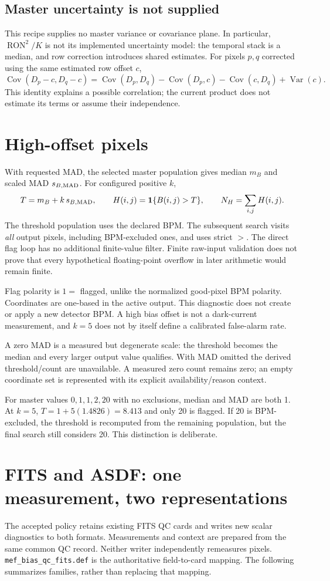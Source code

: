 \documentclass[11pt,a4paper]{article}
\newcommand{\code}[1]{\nolinkurl{#1}}
\newcommand{\Var}{\operatorname{Var}}\newcommand{\Cov}{\operatorname{Cov}}
\newcommand{\ind}{\mathbf{1}}
\begin{document}
\subsection*{Master uncertainty is not supplied}
This recipe supplies no master variance or covariance plane. In particular,
$\operatorname{RON}^2/K$ is not its implemented uncertainty model: the temporal
stack is a median, and row correction introduces shared estimates. For pixels
$p,q$ corrected using the same estimated row offset $c$,
\[
 \Cov(D_p-c,D_q-c)=\Cov(D_p,D_q)-\Cov(D_p,c)
 -\Cov(c,D_q)+\Var(c).
\]
This identity explains a possible correlation; the current product does not
estimate its terms or assume their independence.

\newpage
\section{High-offset pixels}
With requested MAD, the selected master population gives median $m_B$ and
scaled MAD $s_{B,\rm MAD}$. For configured positive $k$,
\[
 T=m_B+k\,s_{B,\rm MAD},\qquad
 H(i,j)=\ind\{B(i,j)>T\},\qquad N_H=\sum_{i,j}H(i,j).
\]
The threshold population uses the declared BPM. The subsequent search visits
\emph{all} output pixels, including BPM-excluded ones, and uses strict $>$.
The direct flag loop has no additional finite-value filter. Finite raw-input
validation does not prove that every hypothetical floating-point overflow in
later arithmetic would remain finite.

Flag polarity is $1=$ flagged, unlike the normalized good-pixel BPM polarity.
Coordinates are one-based in the active output. This diagnostic does not
create or apply a new detector BPM. A high bias offset is not a dark-current
measurement, and $k=5$ does not by itself define a calibrated false-alarm rate.

A zero MAD is a measured but degenerate scale: the threshold becomes the median
and every larger output value qualifies. With MAD omitted the derived
threshold/count are unavailable. A measured zero count remains zero; an empty
coordinate set is represented with its explicit availability/reason context.

For master values $0,1,1,2,20$ with no exclusions, median and MAD are both 1.
At $k=5$, $T=1+5(1.4826)=8.413$ and only 20 is flagged. If 20 is BPM-excluded,
the threshold is recomputed from the remaining population, but the final search
still considers 20. This distinction is deliberate.

\newpage
\section{FITS and ASDF: one measurement, two representations}
The accepted policy retains existing FITS QC cards and writes new scalar
diagnostics to both formats. Measurements and context are prepared from the
same common QC record. Neither writer independently remeasures pixels.
\code{mef_bias_qc_fits.def} is the authoritative field-to-card mapping.
The following summarizes families, rather than replacing that mapping.
\end{document}
